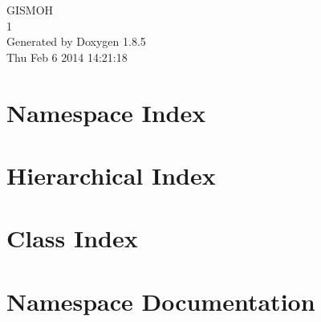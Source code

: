\documentclass[twoside]{book}
\newcommand{\clearemptydoublepage}{%
  \newpage{\pagestyle{empty}\cleardoublepage}%
}
\begin{document}
\hypersetup{pageanchor=false}
\begin{titlepage}
\vspace*{7cm}
\begin{center}%
{\Large G\-I\-S\-M\-O\-H \\[1ex]\large 1 }\\
\vspace*{1cm}
{\large Generated by Doxygen 1.8.5}\\
\vspace*{0.5cm}
{\small Thu Feb 6 2014 14:21:18}\\
\end{center}
\end{titlepage}
\clearemptydoublepage
\tableofcontents
\clearemptydoublepage
{}
\hypersetup{pageanchor=true}

\chapter{Namespace Index}

\chapter{Hierarchical Index}

\chapter{Class Index}

\chapter{Namespace Documentation}




\end{document}
